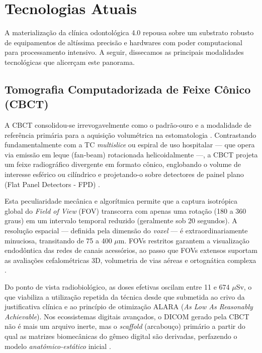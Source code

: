 \section{Tecnologias Atuais}
\label{sec:tecnologias}

A materialização da clínica odontológica 4.0 repousa sobre um substrato robusto de equipamentos de altíssima precisão e hardwares com poder computacional para processamento intensivo. A seguir, dissecamos as principais modalidades tecnológicas que alicerçam este panorama.

\subsection{Tomografia Computadorizada de Feixe Cônico (CBCT)}
\label{subsec:cbct}

A CBCT consolidou-se irrevogavelmente como o padrão-ouro e a modalidade de referência primária para a aquisição volumétrica na estomatologia \cite{bdj2026predictive}. Contrastando fundamentalmente com a TC \textit{multislice} ou espiral de uso hospitalar — que opera via emissão em leque (fan-beam) rotacionada helicoidalmente —, a CBCT projeta um feixe radiográfico divergente em formato cônico, englobando o volume de interesse esférico ou cilíndrico e projetando-o sobre detectores de painel plano (Flat Panel Detectors - FPD) \cite{li2025impacts}.

Esta peculiaridade mecânica e algorítmica permite que a captura isotrópica global do \textit{Field of View} (FOV) transcorra com apenas uma rotação (180 a 360 graus) em um intervalo temporal reduzido (geralmente sob 20 segundos). A resolução espacial — definida pela dimensão do \textit{voxel} — é extraordinariamente minuciosa, transitando de 75 a 400 $\mu$m. FOVs restritos garantem a visualização endodôntica das redes de canais acessórios, ao passo que FOVs extensos suportam as avaliações cefalométricas 3D, volumetria de vias aéreas e ortognática complexa \cite{khoshfekr2025review}.

Do ponto de vista radiobiológico, as doses efetivas oscilam entre 11 e 674 $\mu$Sv, o que viabiliza a utilização repetida da técnica desde que submetida ao crivo da justificativa clínica e ao princípio de otimização ALARA (\textit{As Low As Reasonably Achievable}). Nos ecossistemas digitais avançados, o DICOM gerado pela CBCT não é mais um arquivo inerte, mas o \textit{scaffold} (arcabouço) primário a partir do qual as matrizes biomecânicas do gêmeo digital são derivadas, perfazendo o modelo \textit{anatômico-estático} inicial \cite{katsoulakis2024digital}.

